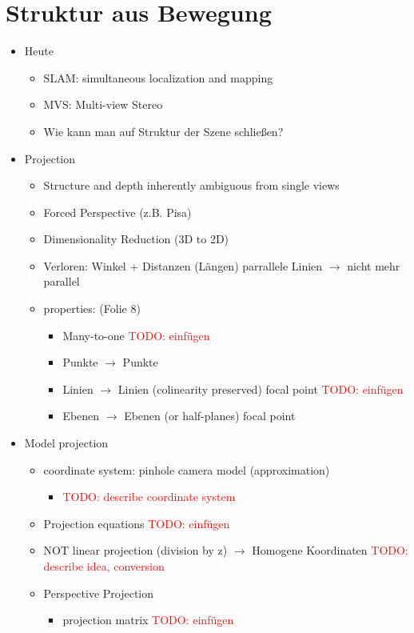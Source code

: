 \documentclass{report}
\newcommand{\todo}[2][red]{\textcolor{#1}{TODO: #2}}
\begin{document}
	\section{Struktur aus Bewegung}
	
	\begin{itemize}
		\item Heute
		\begin{itemize}
			\item SLAM: simultaneous localization and mapping
			\item MVS: Multi-view Stereo
			\item Wie kann man auf Struktur der Szene schließen?
		\end{itemize}
	
		\item Projection
		\begin{itemize}
			\item Structure and depth inherently ambiguous from single views
			\item Forced Perspective (z.B. Pisa)
			\item Dimensionality Reduction (3D to 2D)
			\item Verloren: Winkel + Distanzen (Längen)
			\newline parrallele Linien $\rightarrow$ nicht mehr parallel
			\item properties: (Folie 8)
			\begin{itemize}
				\item Many-to-one \todo{einfügen}
				\item Punkte $\rightarrow$ Punkte
				\item Linien $\rightarrow$ Linien (colinearity preserved)
				\newline focal point \todo{einfügen}
				\item Ebenen $\rightarrow$ Ebenen (or half-planes)
				\newline focal point
			\end{itemize}
		\end{itemize}
	
		\item Model projection
		\begin{itemize}
			\item coordinate system: pinhole camera model (approximation)
			\begin{itemize}
				\item \todo{describe coordinate system}
			\end{itemize}
		
			\item Projection equations \todo{einfügen}
			\item NOT linear projection (division by z)
			\newline $\rightarrow$ Homogene Koordinaten
			\newline \todo{describe idea, conversion}
			\item Perspective Projection
			\begin{itemize}
				\item projection matrix \todo{einfügen}
			\end{itemize}
		

\end{itemize}
\end{itemize}
\end{document}

